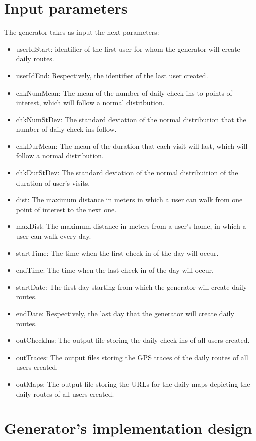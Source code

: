 \section{Input parameters}

The generator takes as input the next parameters: 

\begin{itemize}
 \item userIdStart: identifier of the first user for whom the generator will create daily routes.
 \item userIdEnd: Respectively, the identifier of the last user created.
 \item chkNumMean: The mean of the number of daily check-ins to points of interest, which will follow a normal distribution.
 \item chkNumStDev: The standard deviation of the normal distribution that the number of daily check-ins follow.
 \item chkDurMean: The mean of the duration that each visit will last, which will follow a normal distribution.
 \item chkDurStDev: The standard deviation of the normal distribuition of the duration of user's visits.
 \item dist: The maximum distance in meters in which a user can walk from one point of interest to the next one.
 \item maxDist: The maximum distance in meters from a user's home, in which a user can walk every day.
 \item startTime: The time when the first check-in of the day will occur.
 \item endTime: The time when the last check-in of the day will occur.
 \item startDate: The first day starting from which the generator will create daily routes.
 \item endDate: Respectively, the last day that the generator will create daily routes.
 \item outCheckIns: The output file storing the daily check-ins of all users created.
 \item outTraces: The output files storing the GPS traces of the daily routes of all users created.
 \item outMaps: The output file storing the URLs for the daily maps depicting the daily routes of all users created.
\end{itemize}

\section{Generator's implementation design}

